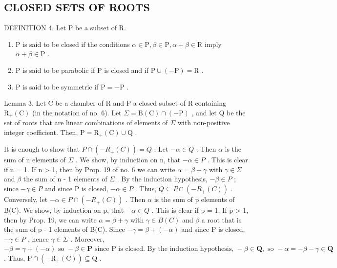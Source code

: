 \subsection{CLOSED SETS OF ROOTS}

DEFINITION 4. Let P be a subset of R.

\begin{enumerate}
\def\labelenumi{(\roman{enumi})}
\item
  P is said to be closed if the conditions \(\alpha \in \mathrm{P},\beta \in \mathrm{P},\alpha +\beta \in \mathrm{R}\) imply \(\alpha +\beta \in \mathrm{P}\) .
\item
  P is said to be parabolic if P is closed and if \(\mathrm{P} \cup (-\mathrm{P}) = \mathrm{R}\) .
\item
  P is said to be symmetric if \(\mathrm{P} = -\mathrm{P}\) .
\end{enumerate}

Lemma 3. Let C be a chamber of R and P a closed subset of R containing \(\mathrm{R}_{+}(\mathrm{C})\) (in the notation of no. 6). Let \(\Sigma = \mathrm{B}(\mathrm{C}) \cap (-\mathrm{P})\) , and let Q be the set of roots that are linear combinations of elements of \(\Sigma\) with non-positive integer coefficient. Then, \(\mathrm{P} = \mathrm{R}_{+}(\mathrm{C}) \cup \mathrm{Q}\) .

It is enough to show that \(P \cap (-R_{+}(C)) = Q\) . Let \(-\alpha \in Q\) . Then \(\alpha\) is the sum of n elements of \(\Sigma\) . We show, by induction on n, that \(-\alpha \in P\) . This is clear if n = 1. If n \textgreater{} 1, then by Prop. 19 of no. 6 we can write \(\alpha = \beta + \gamma\) with \(\gamma \in \Sigma\) and \(\beta\) the sum of n - 1 elements of \(\Sigma\) . By the induction hypothesis, \(-\beta \in P\) ; since \(-\gamma \in P\) and since P is closed, \(-\alpha \in P\) . Thus, \(Q \subseteq P \cap (-R_{+}(C))\) . Conversely, let \(-\alpha \in P \cap (-R_{+}(C))\) . Then \(\alpha\) is the sum of p elements of B(C). We show, by induction on p, that \(-\alpha \in Q\) . This is clear if p = 1. If p \textgreater{} 1, then by Prop. 19, we can write \(\alpha = \beta + \gamma\) with \(\gamma \in B(C)\) and \(\beta\) a root that is the sum of p - 1 elements of B(C). Since \(-\gamma = \beta + (-\alpha)\) and since P is closed, \(-\gamma \in P\) , hence \(\gamma \in \Sigma\) . Moreover, \(-\beta = \gamma + (-\alpha) \text{ so } -\beta \in \mathbf{P} \text{ since P is closed. By the induction hypothesis, } -\beta \in \mathbf{Q}, \text{ so } -\alpha = -\beta - \gamma \in \mathbf{Q}\) . Thus, \(\mathrm{P} \cap (-\mathrm{R}_{+}(\mathrm{C})) \subseteq \mathrm{Q}\) .

